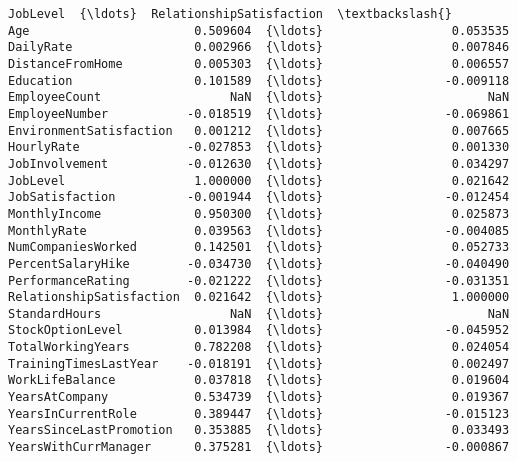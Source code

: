 \documentclass[11pt]{article}
\begin{document}
\begin{Verbatim}[commandchars=\\\{\}]
                          JobLevel  {\ldots}  RelationshipSatisfaction  \textbackslash{}
Age                       0.509604  {\ldots}                  0.053535   
DailyRate                 0.002966  {\ldots}                  0.007846   
DistanceFromHome          0.005303  {\ldots}                  0.006557   
Education                 0.101589  {\ldots}                 -0.009118   
EmployeeCount                  NaN  {\ldots}                       NaN   
EmployeeNumber           -0.018519  {\ldots}                 -0.069861   
EnvironmentSatisfaction   0.001212  {\ldots}                  0.007665   
HourlyRate               -0.027853  {\ldots}                  0.001330   
JobInvolvement           -0.012630  {\ldots}                  0.034297   
JobLevel                  1.000000  {\ldots}                  0.021642   
JobSatisfaction          -0.001944  {\ldots}                 -0.012454   
MonthlyIncome             0.950300  {\ldots}                  0.025873   
MonthlyRate               0.039563  {\ldots}                 -0.004085   
NumCompaniesWorked        0.142501  {\ldots}                  0.052733   
PercentSalaryHike        -0.034730  {\ldots}                 -0.040490   
PerformanceRating        -0.021222  {\ldots}                 -0.031351   
RelationshipSatisfaction  0.021642  {\ldots}                  1.000000   
StandardHours                  NaN  {\ldots}                       NaN   
StockOptionLevel          0.013984  {\ldots}                 -0.045952   
TotalWorkingYears         0.782208  {\ldots}                  0.024054   
TrainingTimesLastYear    -0.018191  {\ldots}                  0.002497   
WorkLifeBalance           0.037818  {\ldots}                  0.019604   
YearsAtCompany            0.534739  {\ldots}                  0.019367   
YearsInCurrentRole        0.389447  {\ldots}                 -0.015123   
YearsSinceLastPromotion   0.353885  {\ldots}                  0.033493   
YearsWithCurrManager      0.375281  {\ldots}                 -0.000867   


\end{Verbatim}
\end{document}
